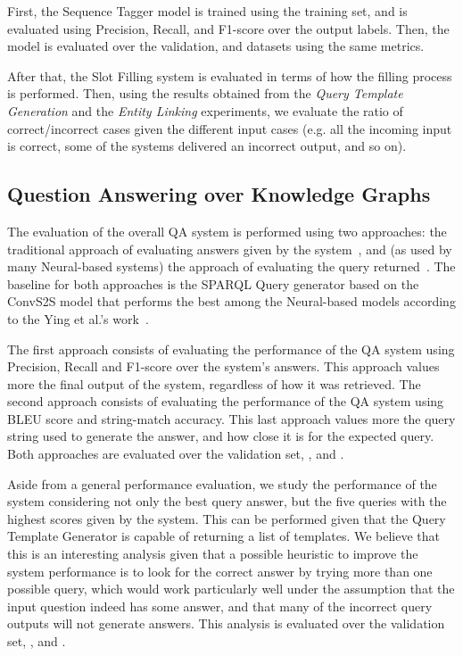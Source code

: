 First, the Sequence Tagger model is trained using the \LCQuADtwo{} training set, and is evaluated 
using Precision, Recall, and F1-score over the output labels. Then, the model is evaluated over 
the \LCQuADtwo{} validation, \QALDseven{} and \WikiSPARQL{} datasets using the same metrics.

After that, the Slot Filling system is evaluated in terms of how the filling process is performed. 
Then, using the results obtained from the \textit{Query Template Generation} and the 
\textit{Entity Linking} experiments, we evaluate the ratio of correct/incorrect cases given the 
different input cases (e.g. all the incoming input is correct, some of the systems delivered an 
incorrect output, and so on).

\subsection{Question Answering over Knowledge Graphs}
\label{cap4:experimentalDesign/QAKG}
The evaluation of the overall QA system is performed using two approaches: the traditional 
approach of evaluating answers given by the system~\cite{qa:qald-Lopezetal2013}, and (as used by 
many Neural-based systems) the approach of evaluating the \SPARQL{} query 
returned~\cite{nmt:nl-to-sparql-Yin19}. The baseline for both approaches is the SPARQL Query 
generator based on the ConvS2S model that performs the best among the Neural-based models 
according to the Ying et al.’s work~\cite{nmt:nl-to-sparql-Yin19}.

The first approach consists of evaluating the performance of the QA system using Precision, 
Recall and F1-score over the system’s answers. This approach values more the final output of the 
system, regardless of how it was retrieved. The second approach consists of evaluating the 
performance of the QA system using BLEU score and string-match accuracy. This last approach 
values more the query string used to generate the answer, and how close it is for the expected 
query. Both approaches are evaluated over the \LCQuADtwo{} validation set, \QALDseven{}, and \WikiSPARQL{}.

Aside from a general performance evaluation, we study the performance of the system considering 
not only the best \SPARQL{} query answer, but the five \SPARQL{} queries with the highest scores given 
by the system. This can be performed given that the Query Template Generator is capable of 
returning a list of templates. We believe that this is an interesting analysis given that a 
possible heuristic to improve the system performance is to look for the correct answer by trying 
more than one possible \SPARQL{} query, which would work particularly well under the assumption 
that the input question indeed has some answer, and that many of the incorrect \SPARQL{} query 
outputs will not generate answers. This analysis is evaluated over the \LCQuADtwo{} validation set, 
\QALDseven{}, and \WikiSPARQL{}.


